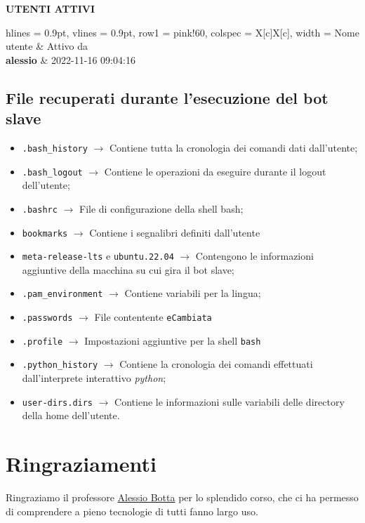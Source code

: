 \documentclass[letterpaper, 11pt]{article}
\begin{document}

\begin{center}
    \textbf{UTENTI ATTIVI}
\end{center}

\begin{tblr}{hlines = {0.9pt}, vlines = {0.9pt}, row{1} = {pink!60}, colspec = {X[c]X[c]}, width = \textwidth}
        Nome utente & Attivo da\\

        \textbf{alessio} & 2022-11-16 09:04:16
\end{tblr}
\subsection{File recuperati durante l'esecuzione del bot slave}
\label{File recuperati}
\begin{itemize}
\item \texttt{.bash\_history} \(\rightarrow\) Contiene tutta la cronologia dei comandi dati dall'utente;
\item \texttt{.bash\_logout} \(\rightarrow\) Contiene le operazioni da eseguire durante il logout dell'utente;
\item \texttt{.bashrc} \(\rightarrow\) File di configurazione della shell bash;
\item \texttt{bookmarks} \(\rightarrow\) Contiene i segnalibri definiti dall'utente
\item \texttt{meta-release-lts}  e \texttt{ubuntu.22.04} \(\rightarrow\) Contengono le informazioni aggiuntive della macchina su cui gira il bot slave;
\item \texttt{.pam\_environment} \(\rightarrow\) Contiene variabili per la lingua;
\item \texttt{.passwords} \(\rightarrow\) File contentente \texttt{eCambiata}
\item \texttt{.profile} \(\rightarrow\) Impostazioni aggiuntive per la shell \texttt{bash}
\item \texttt{.python\_history} \(\rightarrow\) Contiene la cronologia dei comandi effettuati dall'interprete interattivo \emph{python};
\item \texttt{user-dirs.dirs} \(\rightarrow\) Contiene le informazioni sulle variabili delle directory della home dell'utente.
\end{itemize}
\section{Ringraziamenti}
\label{Ringraziamenti}
Ringraziamo il professore \href{mailto:a.botta@unina.it}{Alessio Botta} per lo splendido corso, che ci ha permesso di comprendere a pieno tecnologie di tutti fanno largo uso.
\end{document}
